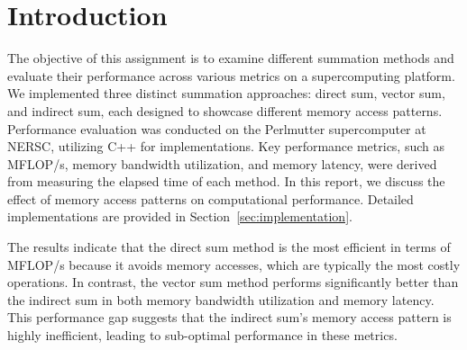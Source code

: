 \section{Introduction}


The objective of this assignment is to examine different summation methods and evaluate their performance across various metrics on a supercomputing platform. We implemented three distinct summation approaches: direct sum, vector sum, and indirect sum, each designed to showcase different memory access patterns. Performance evaluation was conducted on the Perlmutter supercomputer at NERSC, utilizing C++ for implementations. Key performance metrics, such as MFLOP/s, memory bandwidth utilization, and memory latency, were derived from measuring the elapsed time of each method. In this report, we discuss the effect of memory access patterns on computational performance. Detailed implementations are provided in Section~\ref{sec:implementation}.

The results indicate that the direct sum method is the most efficient in terms of MFLOP/s because it avoids memory accesses, which are typically the most costly operations. In contrast, the vector sum method performs significantly better than the indirect sum in both memory bandwidth utilization and memory latency. This performance gap suggests that the indirect sum's memory access pattern is highly inefficient, leading to sub-optimal performance in these metrics.

